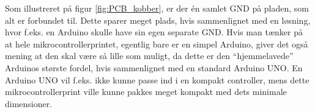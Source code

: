 Som illustreret på figur \ref{fig:PCB_kobber}, er der én samlet GND på pladen, som alt er forbundet til. Dette sparer meget plads, hvis sammenlignet med en løsning, hvor f.eks. en Arduino skulle have sin egen separate GND. Hvis man tænker på at hele mikrocontrollerprintet, egentlig bare er en simpel Arduino, giver det også mening at den skal være så lille som muligt, da dette er den “hjemmelavede” Arduinos største fordel, hvis sammenlignet med en standard Arduino UNO. En Arduino UNO vil f.eks. ikke kunne passe ind i en kompakt controller, mens dette mikrocontrollerprint ville kunne pakkes meget kompakt med dets minimale dimensioner.





